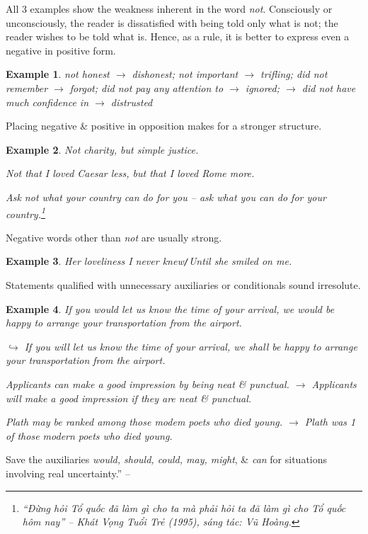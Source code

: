\documentclass[oneside]{book}
\numberwithin{equation}{section}
\newtheorem{example}{Example}[chapter]
\begin{document}
All 3 examples show the weakness inherent in the word \textit{not}. Consciously or unconsciously, the reader is dissatisfied with being told only what is not; the reader wishes to be told what is. Hence, as a rule, it is better to express even a negative in positive form.

\begin{example}
	not honest $\to$ dishonest; not important $\to$ trifling; did not remember $\to$ forgot; did not pay any attention to $\to$ ignored; $\to$ did not have much confidence in $\to$ distrusted
\end{example}
Placing negative \& positive in opposition makes for a stronger structure.

\begin{example}
	Not charity, but simple justice.
	
	Not that I loved Caesar less, but that I loved Rome more.
	
	Ask not what your country can do for you -- ask what you can do for your country.\footnote{ ``Đừng hỏi Tổ quốc đã làm gì cho ta mà phải hỏi ta đã làm gì cho Tổ quốc hôm nay'' -- \textit{Khát Vọng Tuổi Trẻ} (1995), sáng tác: Vũ Hoàng.}
\end{example}
Negative words other than \textit{not} are usually strong.

\begin{example}
	Her loveliness I never knew\emph{\texttt{/}}Until she smiled on me.
\end{example}
Statements qualified with unnecessary auxiliaries or conditionals sound irresolute.

\begin{example}
	If you would let us know the time of your arrival, we would be happy to arrange your transportation from the airport.
	
	$\hookrightarrow$ If you will let us know the time of your arrival, we shall be happy to arrange your transportation from the airport.
	
	Applicants can make a good impression by being neat \& punctual. $\to$ Applicants will make a good impression if they are neat \& punctual.
	
	Plath may be ranked among those modem poets who died young. $\to$ Plath was 1 of those modern poets who died young.
\end{example}
 Save the auxiliaries \textit{would, should, could, may, might}, \& \textit{can} for situations involving real uncertainty.'' --  \cite[Chap. 2, Sect. 15, pp. 33--34]{Strunk_White2019}
\end{document}
